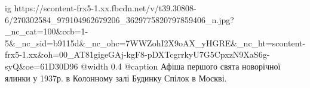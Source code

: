  
 
 
 
 

\ifcmt
  ig https://scontent-frx5-1.xx.fbcdn.net/v/t39.30808-6/270302584_979104962679206_3629775820797859406_n.jpg?_nc_cat=100&ccb=1-5&_nc_sid=b9115d&_nc_ohc=7WWZohI2X9oAX_yHGRE&_nc_ht=scontent-frx5-1.xx&oh=00_AT81gigeGAj-kgF8-pDXTcgrrkyU7G5CpxzN9XaS6g-syQ&oe=61D30D96
  @width 0.4
	@caption Афіша першого свята новорічної ялинки у 1937р. в Колонному залі Будинку Спілок в Москві.
\fi
